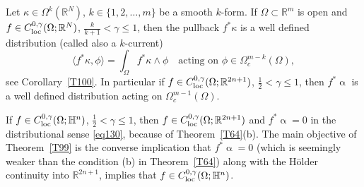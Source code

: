 \documentclass[intlimits,12pt,reqno]{amsart}
\newcommand{\bbbh}{\mathbb H}
\newcommand{\R}{\mathbb R}
\numberwithin{equation}{section}
\theoremstyle{definition}
\begin{document}
Let $\kappa\in\Omega^k(\R^N)$, $k\in\{1,2,\ldots,m\}$ be a smooth $k$-form. If $\Omega\subset\R^m$ is open and $f\in C_{\rm loc}^{0,\gamma}(\Omega;\R^N)$, $\frac{k}{k+1}<\gamma\leq 1$, then the pullback $f^*\kappa$ is a well defined distribution (called also a $k$-current)
\begin{equation}
\label{eq130}
\langle f^*\kappa,\phi\rangle=\int_\Omega f^*\kappa\wedge\phi
\quad
\text{acting on } \phi\in \Omega_c^{m-k}(\Omega),
\end{equation}
see Corollary~\ref{T100}. In particular if $f\in C^{0,\gamma}_{\rm loc}(\Omega;\R^{2n+1})$, $\frac{1}{2}<\gamma\leq 1$, then $f^*\upalpha$ is a well defined distribution acting on $\Omega_c^{m-1}(\Omega)$.

If $f\in C^{0,\gamma}_{\rm loc}(\Omega;\bbbh^n)$, $\frac{1}{2}<\gamma\leq 1$, then 
$f\in C^{0,\gamma}_{\rm loc}(\Omega;\R^{2n+1})$ and $f^*\upalpha=0$ in the distributional sense \eqref{eq130}, because of Theorem~\ref{T64}(b).
The main objective of Theorem~\ref{T99} is the converse implication that $f^*\upalpha=0$ (which is seemingly weaker than the condition (b) in Theorem~\ref{T64}) along with the H\"older continuity into $\R^{2n+1}$, implies that $f\in C^{0,\gamma}_{\rm loc}(\Omega;\bbbh^n)$.
\end{document}

